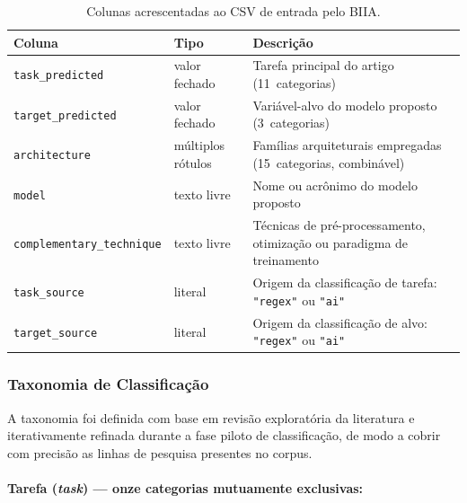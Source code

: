 \begin{table}[htbp]
\centering
\caption{Colunas acrescentadas ao CSV de entrada pelo BIIA.}
\label{tab:biia-colunas}
\begin{tabular}{llp{7.5cm}}
\toprule
\textbf{Coluna} & \textbf{Tipo} & \textbf{Descrição} \\
\midrule
\texttt{task\_predicted}         & valor fechado   & Tarefa principal do artigo (11~categorias) \\
\texttt{target\_predicted}       & valor fechado   & Variável-alvo do modelo proposto (3~categorias) \\
\texttt{architecture}            & múltiplos rótulos & Famílias arquiteturais empregadas (15~categorias, combinável) \\
\texttt{model}                   & texto livre     & Nome ou acrônimo do modelo proposto \\
\texttt{complementary\_technique}& texto livre     & Técnicas de pré-processamento, otimização ou paradigma de treinamento \\
\texttt{task\_source}            & literal         & Origem da classificação de tarefa: \texttt{"regex"} ou \texttt{"ai"} \\
\texttt{target\_source}          & literal         & Origem da classificação de alvo: \texttt{"regex"} ou \texttt{"ai"} \\
\bottomrule
\end{tabular}
\end{table}


\subsubsection{Taxonomia de Classificação}

A taxonomia foi definida com base em revisão exploratória da
literatura e iterativamente refinada durante a fase piloto de
classificação, de modo a cobrir com precisão as linhas de pesquisa
presentes no corpus.

\paragraph{Tarefa (\textit{task}) — onze categorias mutuamente exclusivas:}

